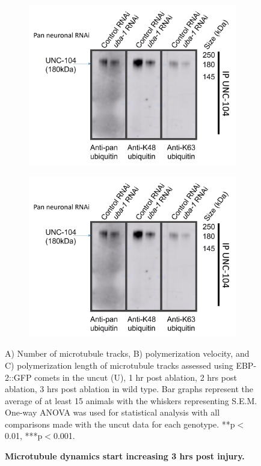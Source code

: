 \begin{appendices}
\begin{figure}[H]
\begin{subfigure}{0.3\textwidth}
		\end{subfigure}
		\begin{subfigure}{0.3\textwidth}
			\caption{}
			\includegraphics[width=\textwidth]{figs/example}
			
		\end{subfigure}
		\begin{subfigure}{0.3\textwidth}
			\caption{}
			\includegraphics[width=\textwidth]{figs/example}
			
		\end{subfigure}
		
		\caption[Microtubule dynamics start increasing 3 hrs post injury.]{\textbf{Microtubule dynamics start increasing 3 hrs post injury.}} \raggedright \small A) Number of microtubule tracks, B) polymerization velocity, and C) polymerization length of microtubule tracks assessed using EBP-2::GFP comets in the uncut (U), 1 hr post ablation, 2 hrs post ablation, 3 hrs post ablation in wild type. Bar graphs represent the average of at least 15 animals with the whiskers representing S.E.M. One-way ANOVA was used for statistical analysis with all comparisons made with the uncut data for each genotype. **p$<$0.01, ***p$<$0.001.
		\label{fig:MTdyntime}
	\end{figure}
	

\end{appendices}

